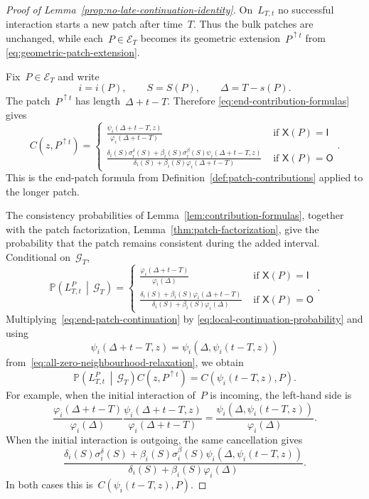 \documentclass[EJP,preprint,NODS,nobera]{ejpecp}
\newcommand{\pP}{\mathbb{P}}
\newcommand{\CP}[2]{\pP\bb{#1\,\middle|\,#2}}
\newcommand{\bb}[1]{\left(#1\right)}
\newcommand{\pw}[4]{\left\{\begin{array}{cl}
  #1 &\text{ if } #2 \\
  #3 &\text{ if } #4
\end{array}\right.}
\begin{document}
\begin{proof}[Proof of Lemma~\ref{prop:no-late-continuation-identity}]
On~$L_{T,t}$ no successful interaction starts a new patch after time~$T$.
Thus the bulk patches are unchanged, while each~$P\in\mathcal E_T$ becomes its
geometric extension~$P^{\uparrow t}$ from
\eqref{eq:geometric-patch-extension}.

Fix~$P\in\mathcal E_T$ and write
\begin{equation*}
i=i(P),
\qquad
S=S(P),
\qquad
\Delta=T-s(P).
\end{equation*}
The patch~$P^{\uparrow t}$ has length~$\Delta+t-T$. Therefore
\eqref{eq:end-contribution-formulas} gives
\begin{equation}
\label{eq:end-patch-continuation}
C\bb{z,P^{\uparrow t}}
=
\pw{
\displaystyle
\frac{\psi_i(\Delta+t-T,z)}{\varphi_i(\Delta+t-T)}
}{\mathsf X(P)=\mathsf I}
{
\displaystyle
\frac{
\delta_i(S)\sigma_i^\delta(S)
+
\beta_i(S)\sigma_i^\beta(S)\psi_i(\Delta+t-T,z)
}{
\delta_i(S)+\beta_i(S)\varphi_i(\Delta+t-T)
}
}{\mathsf X(P)=\mathsf O}.
\end{equation}
This is the end-patch formula from Definition~\ref{def:patch-contributions} applied to
the longer patch.

The consistency probabilities of Lemma~\ref{lem:contribution-formulas},
together with the patch factorization, Lemma~\ref{thm:patch-factorization},
give the probability that the patch remains consistent
during the added interval. Conditional on~$\mathcal G_T$,
\begin{equation}
\label{eq:local-continuation-probability}
\CP{L_{T,t}^P}{\mathcal G_T}
=
\pw{
\displaystyle
\frac{\varphi_i(\Delta+t-T)}{\varphi_i(\Delta)}
}{\mathsf X(P)=\mathsf I}
{
\displaystyle
\frac{
\delta_i(S)+\beta_i(S)\varphi_i(\Delta+t-T)
}{
\delta_i(S)+\beta_i(S)\varphi_i(\Delta)
}
}{\mathsf X(P)=\mathsf O}.
\end{equation}
Multiplying~\eqref{eq:end-patch-continuation} by
\eqref{eq:local-continuation-probability} and using
\begin{equation*}
\psi_i(\Delta+t-T,z)
=
\psi_i\bb{\Delta,\psi_i(t-T,z)}
\end{equation*}
from~\eqref{eq:all-zero-neighbourhood-relaxation}, we obtain
\begin{equation}
\label{eq:local-probability-weighted-continuation}
\CP{L_{T,t}^P}{\mathcal G_T}
C\bb{z,P^{\uparrow t}}
=
C\bb{\psi_i(t-T,z),P}.
\end{equation}
For example, when the initial interaction of~$P$ is incoming, the left-hand
side is
\begin{equation*}
\frac{\varphi_i(\Delta+t-T)}{\varphi_i(\Delta)}
\frac{\psi_i(\Delta+t-T,z)}{\varphi_i(\Delta+t-T)}
=
\frac{\psi_i\bb{\Delta,\psi_i(t-T,z)}}{\varphi_i(\Delta)}.
\end{equation*}
When the initial interaction is outgoing, the same cancellation gives
\begin{equation*}
\frac{
\delta_i(S)\sigma_i^\delta(S)
+
\beta_i(S)\sigma_i^\beta(S)
\psi_i\bb{\Delta,\psi_i(t-T,z)}
}{
\delta_i(S)+\beta_i(S)\varphi_i(\Delta)
}.
\end{equation*}
In both cases this is~$C(\psi_i(t-T,z),P)$.


\end{proof}
\end{document}
